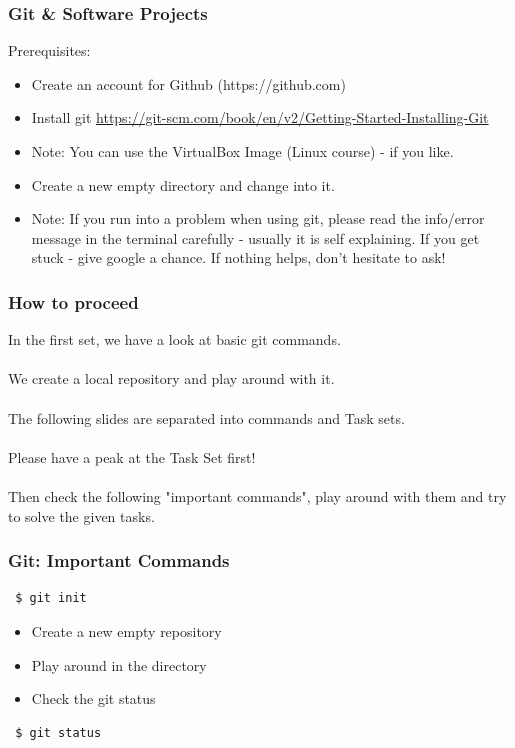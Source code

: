 \documentclass{beamer} %
\begin{document}
\begin{frame}[t]
\frametitle{Git \& Software Projects}
Prerequisites:
\begin{itemize}
\item Create an account for Github (https://github.com)
\item Install git \url{https://git-scm.com/book/en/v2/Getting-Started-Installing-Git}
\item Note: You can use the VirtualBox Image (Linux course) - if you like. 
\item Create a new empty directory and change into it.
\item Note: If you run into a problem when using git, please read the info/error message in the terminal carefully - usually it is self explaining. If you get stuck - give google a chance. If nothing helps, don't hesitate to ask! 
\end{itemize}
\end{frame}

\begin{frame}[t, fragile]
\frametitle{How to proceed}
In the first set, we have a look at basic git commands. \\
\\
We create a local repository and play around with it. \\
\\
The following slides are separated into commands and Task sets. \\
\\
Please have a peak at the Task Set first! \\
\\
Then check the following "important commands", play around with them and
try to solve the given tasks. 
\end{frame}

\begin{frame}[t, fragile]
\frametitle{Git: Important Commands}

\begin{verbatim} 
 $ git init
\end{verbatim}

\begin{itemize}
    \setlength\itemsep{1em}
	\item Create a new empty repository
    \item Play around in the directory
    \item Check the git status
\end{itemize}

\begin{verbatim} 
 $ git status
\end{verbatim}
\end{frame}
\end{document}
